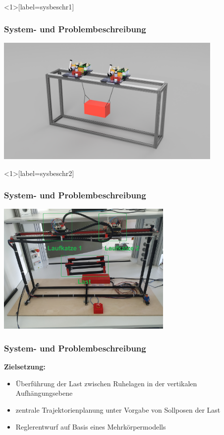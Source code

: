 \documentclass[
	ngerman,
	10pt,				%
	aspectratio=169, 	%
	xcolor=dvipsnames
]{beamer}
\begin{document}

\begin{frame}<1>[label=sysbeschr1]
	\frametitle{System- { und Problembeschreibung}}
	\begin{center}
		\includegraphics[width=110mm]{images/Veritas_demo_CAD}
	\end{center}

\end{frame}


\begin{frame}<1>[label=sysbeschr2]
	\frametitle{System- { und Problembeschreibung}}
	\begin{center}
		\includegraphics[width=85mm]{images/real_gantry}
	\end{center}
	
\end{frame}


\begin{frame}[label=sysbeschr3]
	\frametitle{System- und Problembeschreibung}
	\textbf{Zielsetzung:}
	\begin{itemize}
		\item Überführung der Last zwischen Ruhelagen in der vertikalen Aufhängungsebene
		\pause
		\item zentrale Trajektorienplanung unter Vorgabe von Sollposen der Last
		\pause
		\item Reglerentwurf auf Basis eines Mehrkörpermodells
	\end{itemize}
\end{frame}
\end{document}
